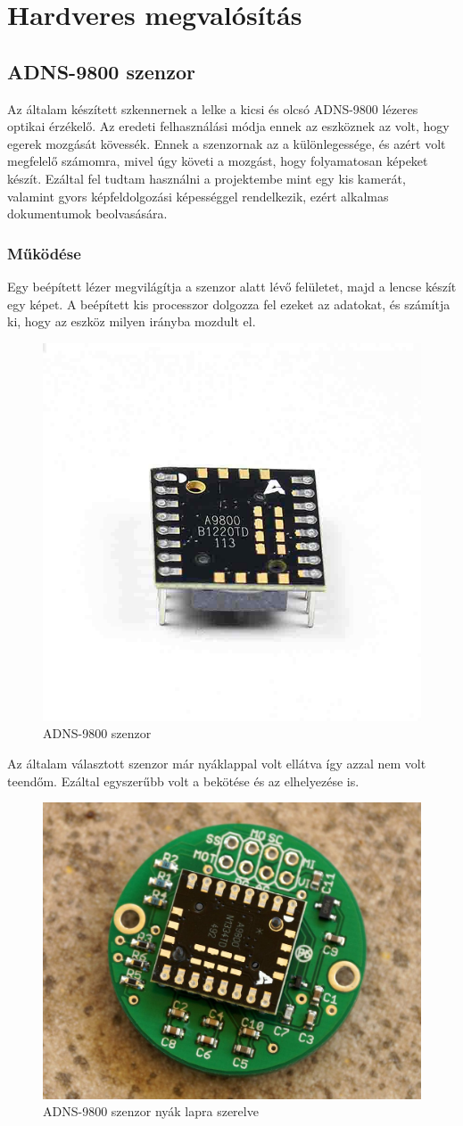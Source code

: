 \documentclass[]{thesis-ekf}
\theoremstyle{definition}
\theoremstyle{remark}
\begin{document}
\chapter{Hardveres megvalósítás}
\section{ADNS-9800 szenzor}
Az általam készített szkennernek a lelke a kicsi és olcsó ADNS-9800\cite{adns9800} lézeres optikai érzékelő. Az eredeti felhasználási módja ennek az eszköznek az volt, hogy egerek mozgását kövessék. Ennek a szenzornak az a különlegessége, és azért volt megfelelő számomra, mivel úgy követi a mozgást, hogy folyamatosan képeket készít. Ezáltal fel tudtam használni a projektembe mint egy kis kamerát, valamint gyors képfeldolgozási képességgel rendelkezik, ezért alkalmas dokumentumok beolvasására. 
\subsection{Működése}
 Egy beépített lézer megvilágítja a szenzor alatt lévő felületet, majd a lencse készít egy képet. A beépített kis processzor dolgozza fel ezeket az adatokat, és számítja ki, hogy az eszköz milyen irányba mozdult el. 
\begin{figure}[th!]
	\centering
	\includegraphics[width=0.4\linewidth]{ADNS9800base}
	\caption[ADNS9800]{ADNS-9800 szenzor}
	\label{fig:adns9800base}
\end{figure}

Az általam választott szenzor már nyáklappal volt ellátva így azzal nem volt teendőm. Ezáltal egyszerűbb volt a bekötése és az elhelyezése is.

\begin{figure}[th!]
	\centering
	\includegraphics[width=0.5\linewidth]{ADNS9800}
	\caption[ADNS9800]{ADNS-9800 szenzor nyák lapra szerelve}
	\label{fig:adns9800}
\end{figure}
\end{document}
